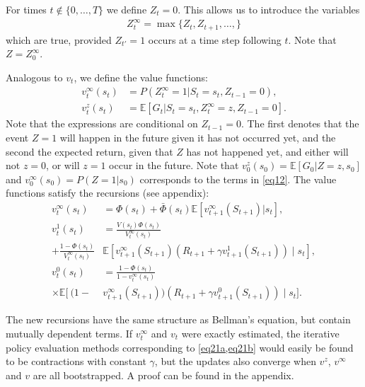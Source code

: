 \documentclass[letterpaper]{article} %
\newcommand{\EE}{\mathbb{E}}
\begin{document}
	For times $t \notin \{0,\dots,T\}$ we define $Z_t = 0$. This allows us to introduce the variables %
	\begin{align}
		Z_t^\infty = \max\{Z_t,Z_{t+1}, \dots,\} %
	\end{align}
	which are true, provided $Z_{t'}=1$ occurs at a time step following $t$. Note that $Z = Z_0^\infty$.


	Analogous to $v_t$, we define the value functions:
	\begin{align}
		v^{\infty}_t(s_t) & = P(Z^\infty_t =1 | S_t=s_t, Z_{t-1} = 0), \label{eq18} \\
		v^{z}_t(s_t) & = \EE[G_t | S_t=s_t, Z_t^\infty = z, Z_{t-1} = 0].  \label{eq19}
	\end{align}
	Note that the expressions are conditional on $Z_{t-1} = 0$. The first denotes that the event $Z=1$ will happen in the future given it has not occurred yet, and the second the expected return, given that $Z$ has not happened yet, and either will not $z=0$, or will $z=1$ occur in the future. Note that $v^z_{0}(s_0) = \EE\left[G_0 | Z=z,s_0\right]$ and $v^\infty_0(s_0) = P(Z=1|s_0)$ corresponds to the terms in \cref{eq12}. The value functions satisfy the recursions (see appendix): %
	\begin{subequations} \label{eqx19}
		\begin{align}%
			v^\infty_t(s_t) & = \Phi(s_t) + \bar \Phi(s_t) \EE\left[ v^\infty_{t+1}(S_{t+1} )| s_t\right],\label{eq20a}   \\
			v^{1}_t(s_t) & =  \frac{ V(s_t) \Phi(s_t) }{V_t^\infty(s_t) }   \label{eq21a}  \\
			+ \frac{  1\!-\! \Phi(s_t)  }{V_t^\infty(s_t) } & \EE\left[ v^\infty_{t+1}(S_{t+1}) \left( R_{t+1} + \gamma v^{1}_{t+1}(S_{t+1} ) \right) \mid s_t   \right], \nonumber \\
			v^{0}_t(s_t) & =
			\frac{ 1- \Phi(s_t)  }{ 1\!-\!v_t^\infty(s_t) } \label{eq21b} \\
			\times \EE[
			\ ( 1-&v_{t+1}^\infty(S_{t+1}) )(
			R_{t+1}  + \gamma v^{0}_{t+1}(S_{t+1}) ) \mid s_t ].  \nonumber
		\end{align}
	\end{subequations}

	The new recursions have the same structure as Bellman's equation, but contain mutually dependent terms. If $v_t^\infty$ and $v_t$ were exactly estimated, the iterative policy evaluation methods corresponding to \cref{eq21a,eq21b} would easily be found to be contractions with constant $\gamma$, but the updates also converge when $v^z$, $v^\infty$ and $v$ are all bootstrapped. A proof can be found in the appendix. %
\end{document}
